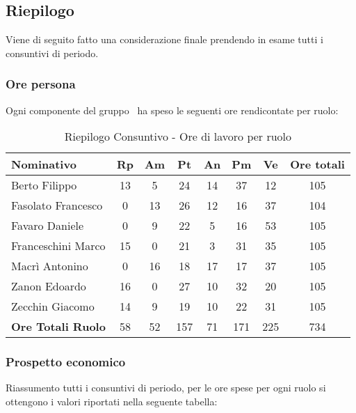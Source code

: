 \documentclass[../PianoDiProgetto_v4.0.0.tex]{subfiles}
\begin{document}
		\newpage
		\subsection{Riepilogo}
		Viene di seguito fatto una considerazione finale prendendo in esame tutti i consuntivi di periodo.
		
		\subsubsection{Ore persona}
		Ogni componente del gruppo \kpanic\ ha speso le seguenti ore rendicontate per ruolo:
		\begin{table}[h]
				\begin{tabularx}{\textwidth}{l * {6}{C} c}
				\toprule
				\textbf{Nominativo} & \textbf{Rp} & \textbf{Am} & \textbf{Pt} & \textbf{An} & \textbf{Pm} & \textbf{Ve} & \textbf{Ore totali} \\
				\midrule
				Berto Filippo &	13 & 5 & 24 & 14 & 37 & 12 & 105 \\
				Fasolato Francesco & 0 & 13 & 26 & 12 & 16 & 37 & 104 \\
				Favaro Daniele & 0 & 9 & 22 & 5 & 16 & 53 & 105 \\
				Franceschini Marco & 15 & 0 & 21 & 3 & 31 & 35 & 105 \\
				Macrì Antonino & 0 & 16 & 18 & 17 & 17 & 37 & 105 \\
				Zanon Edoardo &	16 & 0 & 27 & 10 & 32 & 20 & 105 \\
				Zecchin Giacomo & 14 & 9 & 19 & 10 & 22 & 31 & 105 \\
				\midrule			
				\textbf{Ore Totali Ruolo} & 58 & 52 & 157 & 71 & 171 & 225 & 734 \\
				\bottomrule
				\end{tabularx}
				\caption{Riepilogo Consuntivo - Ore di lavoro per ruolo}		
		\end{table}
		
		\subsubsection{Prospetto economico}
		Riassumento tutti i consuntivi di periodo, per le ore spese per ogni ruolo si ottengono i valori riportati nella seguente tabella:
		
\end{document}
